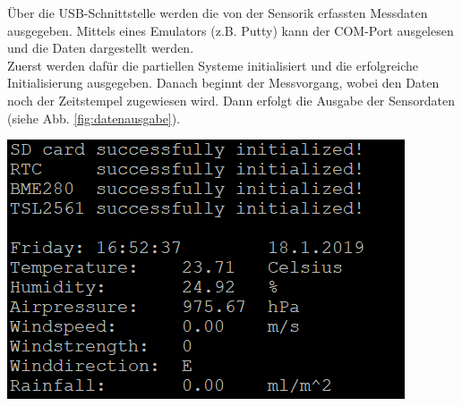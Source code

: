 {\begin{minipage}[b][5cm][t]{0.55\textwidth}
Über die USB-Schnittstelle werden die von der Sensorik erfassten Messdaten ausgegeben. Mittels eines Emulators (z.B. Putty) kann der COM-Port ausgelesen und die Daten dargestellt werden.\\

Zuerst werden dafür die partiellen Systeme initialisiert und die erfolgreiche Initialisierung ausgegeben. Danach beginnt der Messvorgang, wobei den Daten noch der Zeitstempel zugewiesen wird. Dann erfolgt die Ausgabe der Sensordaten (siehe Abb. \ref{fig:datenausgabe}).\\
\end{minipage}}
{\begin{minipage}[b][5cm][t]{0.44\textwidth}
\centering
\includegraphics[width=\textwidth]{graphics/prototyping/ausgabe.PNG}
\label{fig:datenausgabe}
\end{minipage}}